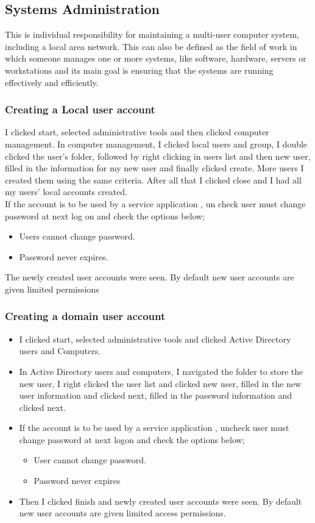 \documentclass{article}
\begin{document}
\subsection{Systems Administration}
This is individual responsibility for maintaining a multi-user computer system, including a local
area network. This can also be defined as the field of work in which someone manages one or more systems, like software, hardware, servers or workstations and its main goal is ensuring that the systems are running effectively and efficiently.
\subsubsection{Creating a Local user account}
I clicked start, selected administrative tools and then clicked computer management. In computer management, I clicked local users and group, I double clicked the user’s folder, followed by right clicking in users list and then new user, filled in the information for my new user and finally clicked create. More users I created them using the same criteria. After all that I clicked close and I had all my users’ local accounts created.\\
If the account is to be used by a service application , un check user must change password at next log on and check the options below;
\begin{itemize}
\item Users cannot change password.
\item Password never expires.
\end{itemize}
The newly created user accounts were seen. By default new user accounts are given limited permissions
\subsubsection{Creating a domain user account}
\begin{itemize}
\item I clicked start, selected administrative tools and clicked Active Directory users and Computers.
\item In Active Directory users and computers, I navigated the folder to store the new user, I right clicked the user list and clicked new user, filled in the new user information and clicked next, filled in the password information and clicked next.
\item If the account is to be used by a service application , uncheck user must change password at next logon and check the options below;
\begin{itemize}
\item User cannot change password.
\item Password never expires
\end{itemize}
\item Then I clicked finish and newly created user accounts were seen. By default new user accounts are given limited access permissions.
\end{itemize}
\end{document}
